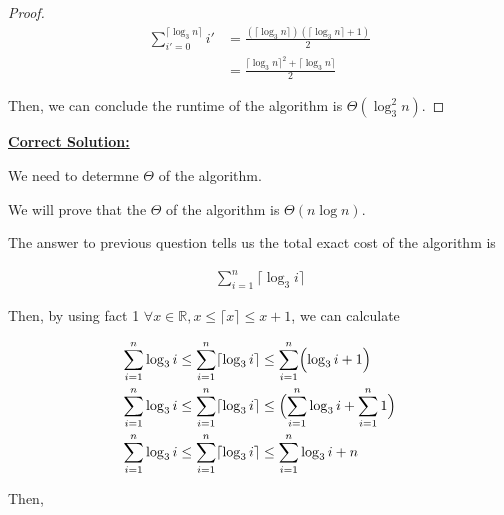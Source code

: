 \documentclass[12pt]{article}
\begin{document}
\begin{enumerate}[a.]
\begin{proof}
        \begin{align}
            \sum\limits_{i'=0}^{\lceil \log_3 n \rceil} i' &= \frac{(\lceil \log_3 n \rceil)(\lceil \log_3 n \rceil + 1)}{2}\\
            &= \frac{\lceil \log_3 n \rceil^2 + \lceil \log_3 n\rceil}{2}
        \end{align}

        \bigskip

        Then, we can conclude the runtime of the algorithm is $\Theta(\log_3^2 n)$.
    \end{proof}

    \bigskip

    \begin{mdframed}
        \underline{\textbf{Correct Solution:}}

        \bigskip

        \color{red}
        We need to determne $\Theta$ of the algorithm.

        \bigskip

        We will prove that the $\Theta$ of the algorithm is $\Theta(n\log n)$.

        \bigskip

        The answer to previous question tells us the total exact cost of the
        algorithm is

        \begin{align}
            \sum\limits_{i=1}^n \lceil \log_3 i \rceil
        \end{align}

        \bigskip

        Then, by using fact 1 $\forall x \in \mathbb{R}, x \leq \lceil x \rceil \leq x + 1$,
        we can calculate

        \begin{align}
            \sum\limits_{i=1}^n \log_3 i &\leq \sum\limits_{i=1}^n \lceil \log_3 i \rceil \leq \sum\limits_{i=1}^n \Bigl( \log_3 i + 1 \Bigr)\\
            \sum\limits_{i=1}^n \log_3 i &\leq \sum\limits_{i=1}^n \lceil \log_3 i \rceil \leq \Bigl(\sum\limits_{i=1}^n \log_3 i + \sum\limits_{i=1}^n 1 \Bigr)\\
            \sum\limits_{i=1}^n \log_3 i &\leq \sum\limits_{i=1}^n \lceil \log_3 i \rceil \leq \sum\limits_{i=1}^n \log_3 i + n
        \end{align}

        \bigskip

        Then,


\end{mdframed}
\end{enumerate}
\end{document}
